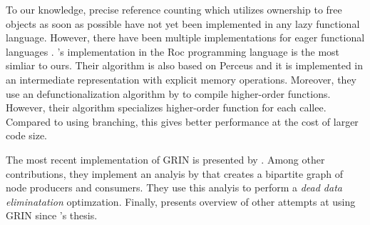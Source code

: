 \documentclass[9pt, twocolumn]{article}
\begin{document}
To our knowledge, precise reference counting which utilizes ownership to free objects as soon as possible have not yet been implemented in any lazy functional language.
However, there have been multiple implementations for eager functional languages \citep{reinking2021, ullrich2021, teeuwissen2023, pinto2023}.
\citeauthor{teeuwissen2023}'s implementation in the Roc programming language is the most simliar to ours.
Their algorithm is also based on Perceus and it is implemented in an intermediate representation with explicit memory operations.
Moreover, they use an defunctionalization algorithm by \citet{brandon2023} to compile higher-order functions.
However, their algorithm specializes higher-order function for each callee.
Compared to using branching, this gives better performance at the cost of larger code size.

The most recent implementation of GRIN is presented by \citet{podlovics2021}.
Among other contributions, they implement an analyis by \citet{turk2010} that creates a bipartite graph of node producers and consumers.
They use this analyis to perform a \emph{dead data eliminatation} optimzation. 
Finally, \citet{podlovics2021} presents overview of other attempts at using GRIN since \citeauthor{boquist1999}'s thes\-is.



%




\end{document}
